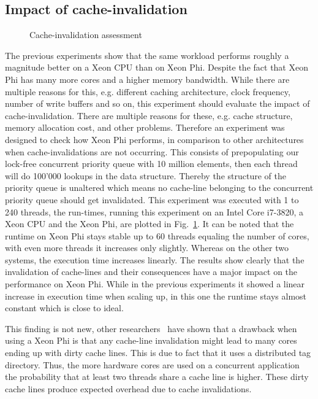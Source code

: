 \subsection{Impact of cache-invalidation}
\begin{figure}[t]
	\centering
	
	\caption{Cache-invalidation assessment}
	\label{fig:comp_contains}
\end{figure}
The previous experiments show that the same workload performs roughly a magnitude better on a Xeon CPU than on Xeon Phi.
Despite the fact that Xeon Phi has many more cores and a higher memory bandwidth.
While there are multiple reasons for this, e.g. different caching architecture, clock frequency, number of write buffers and so on, this experiment should evaluate the impact of cache-invalidation.
There are multiple reasons for these, e.g. cache structure, memory allocation cost, and other problems.
Therefore an experiment was designed to check how Xeon Phi performs, in comparison to other architectures when cache-invalidations are not occurring.
This consists of prepopulating our lock-free concurrent priority queue with 10 million elements, then each thread will do 100'000 lookups in the data structure.
Thereby the structure of the priority queue is unaltered which means no cache-line belonging to the concurrent priority queue should get invalidated.
This experiment was executed with 1 to 240 threads, the run-times, running this experiment on an Intel Core i7-3820, a Xeon CPU and the Xeon Phi, are plotted in Fig.~\ref{fig:comp_contains}.
It can be noted that the runtime on Xeon Phi stays stable up to 60 threads equaling the number of cores, with even more threads it increases only slightly.
Whereas on the other two systems, the execution time increases linearly.
The results show clearly that the invalidation of cache-lines and their consequences have a major impact on the performance on Xeon Phi.
While in the previous experiments it showed a linear increase in execution time when scaling up, in this one the runtime stays almost constant which is close to ideal.

This finding is not new, other researchers~\cite{ramos-hoefler-cc-modeling} have shown that a drawback when using a Xeon Phi is that any cache-line invalidation might lead to many cores ending up with dirty cache lines. This is due to fact that it uses a distributed tag directory. Thus, the more hardware cores are used on a concurrent application the probability that at least two threads share a cache line is higher. These dirty cache lines produce expected overhead due to cache invalidations.


